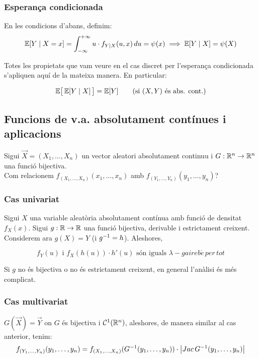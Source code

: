\subsubsection{Esperança condicionada}

En les condicions d'abans, definim:
\[
  \mathbb{E}[Y\mid X=x] = \int_{-\infty}^{+\infty}u\cdot f_{Y\mid X}(u,x)\, du = \psi(x) \implies \mathbb{E}[Y\mid X] = \psi(X)
\]

Totes les propietats que vam veure en el cas discret per l'esperança condicionada s'apliquen aquí de la mateixa manera. En particular:

\begin{prop}
  \[
    \mathbb{E}\big[\,\mathbb{E}[Y\mid X]\,\big] = \mathbb{E}[Y] \qquad \text{(si $(X,Y)$ és abs. cont.)}
  \]
\end{prop}

\subsection{Funcions de v.a. absolutament contínues i aplicacions}

Sigui $\overrightarrow{X} = (X_{1}, \ldots , X_{n})$ un vector aleatori absolutament 
continuu i $G:\mathbb{R}^{n} \to \mathbb{R}^{n}$ una funció bijectiva. \\

Com relacionem $f_{(X_{1},\ldots, X_{n})}(x_{1},\ldots,x_{n})$ amb $f_{(Y_{1},\ldots, Y_{n})}(y_{1},\ldots,y_{n})$?

\subsubsection{Cas univariat}
Sigui $X$ una variable aleatòria absolutament contínua amb funció de densitat $f_{X}(x)$. Sigui $g:\mathbb{R} \to \mathbb{R}$ una funció bijectiva, derivable i estrictament creixent. Considerem ara $g(X) = Y$ (i $g^{-1} = h$). Aleshores,

\[f_{Y}(u) \text{ i } f_{X}(h(u))\cdot h'(u) \text{ són iguals } \lambda-gaireb\acute{e} \, per \, tot\]

\begin{obs}
  Si $g$ no és bijectiva o no és estrictament creixent, en general l'anàlisi és més complicat.
\end{obs}

\subsubsection{Cas multivariat}
$G(\overrightarrow{X}) = \overrightarrow{Y}$ on $G$ és bijectiva i $\mathcal{C}^{1}(\mathbb{R}^{n})$, aleshores, de manera similar al cas anterior, tenim:
\[
  f_{(Y_{1},\ldots,Y_{n})}(y_{1},\ldots,y_{n}) = f_{(X_{1},\ldots,X_{n})}(G^{-1}(y_{1},\ldots,y_{n}))\cdot \left\vert Jac\,G^{-1}(y_{1},\ldots,y_{n}) \right\vert
\]

